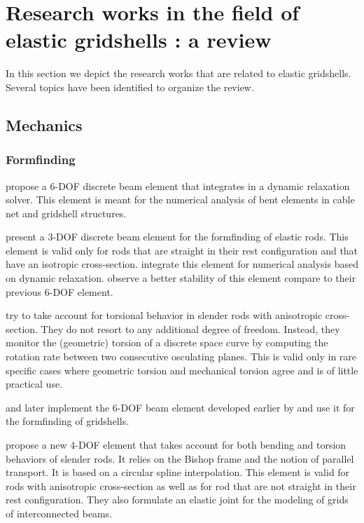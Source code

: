 \clearpage
\section{Research works in the field of elastic gridshells : a review}
In this section we depict the research works that are related to elastic gridshells. Several topics have been identified to organize the review.
\cite{Toussaint2007}


\subsection{Mechanics}

\subsubsection{Formfinding}

 propose a 6-DOF discrete beam element that integrates in a dynamic relaxation solver. This element is meant for the numerical analysis of bent elements in cable net and gridshell structures.

 present a 3-DOF discrete beam element for the formfinding of elastic rods. This element is valid only for rods that are straight in their rest configuration and that have an isotropic cross-section.  integrate this element for numerical analysis based on dynamic relaxation.  observe a better stability of this element compare to their previous 6-DOF element.

 try to take account for torsional behavior in slender rods with anisotropic cross-section. They do not resort to any additional degree of freedom. Instead, they monitor the (geometric) torsion of a discrete space curve by computing the rotation rate between two consecutive osculating planes. This is valid only in rare specific cases where geometric torsion and mechanical torsion agree and is of little practical use.

 and later  implement the 6-DOF beam element developed earlier by  and use it for the formfinding of gridshells.

 propose a new 4-DOF element that takes account for both bending and torsion behaviors of slender rods. It relies on the Bishop frame and the notion of parallel transport. It is based on a circular spline interpolation. This element is valid for rods with anisotropic cross-section as well as for rod that are not straight in their rest configuration. They also formulate an elastic joint for the modeling of grids of interconnected beams.

